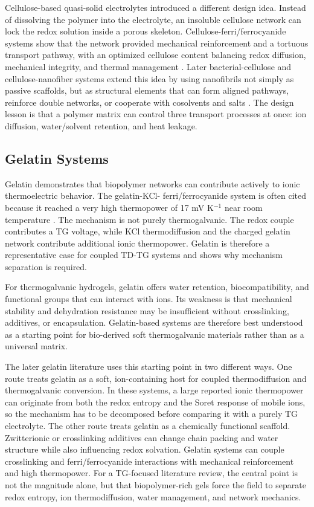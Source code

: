 Cellulose-based quasi-solid electrolytes introduced a different design idea.
Instead of dissolving the polymer into the electrolyte, an insoluble cellulose
network can lock the redox solution inside a porous skeleton.
Cellulose-ferri/ferrocyanide systems show that the network
provided mechanical reinforcement and a tortuous transport pathway, with an
optimized cellulose content balancing redox diffusion, mechanical integrity, and
thermal management \citep{jin2016quasisolid}. Later bacterial-cellulose and
cellulose-nanofiber systems extend this idea by using nanofibrils not simply as
passive scaffolds, but as structural elements that can form aligned pathways,
reinforce double networks, or cooperate with cosolvents and salts
\citep{yin2023bacterial,lin2024triple}. The design lesson is that a polymer matrix can control
three transport processes at once: ion diffusion, water/solvent retention, and
heat leakage.

\subsection{Gelatin Systems}

Gelatin demonstrates that biopolymer networks can
contribute actively to ionic thermoelectric behavior. The gelatin-KCl-
ferri/ferrocyanide system is often cited because it reached a very high
thermopower of 17 mV K$^{-1}$ near room temperature \citep{han2020gelatin}.
The mechanism is not purely thermogalvanic. The redox couple contributes a TG
voltage, while KCl thermodiffusion and the charged gelatin network contribute
additional ionic thermopower. Gelatin is therefore a representative case for
coupled TD-TG systems and shows why mechanism separation is required.

For thermogalvanic hydrogels, gelatin offers water retention, biocompatibility,
and functional groups that can interact with ions. Its weakness is that
mechanical stability and dehydration resistance may be insufficient without
crosslinking, additives, or encapsulation. Gelatin-based systems are therefore
best understood as a starting point for bio-derived soft thermogalvanic
materials rather than as a universal matrix.

The later gelatin literature uses this starting point in two different ways.
One route treats gelatin as a soft, ion-containing host for coupled
thermodiffusion and thermogalvanic conversion. In these systems, a large
reported ionic thermopower can originate from both the redox entropy and the
Soret response of mobile ions, so the mechanism has to be decomposed before
comparing it with a purely TG electrolyte. The other route treats gelatin as a
chemically functional scaffold. Zwitterionic or crosslinking additives can
change chain packing and water structure while also influencing redox solvation.
Gelatin systems can couple crosslinking and ferri/ferrocyanide interactions
with mechanical reinforcement and high thermopower. For a TG-focused literature review, the
central point is not the magnitude alone, but that
biopolymer-rich gels force the field to separate redox entropy, ion
thermodiffusion, water management, and network mechanics.

